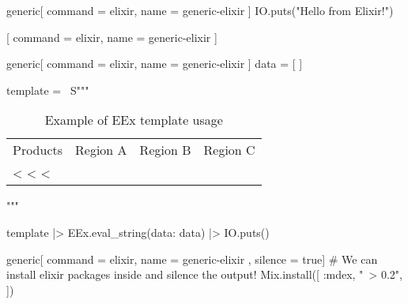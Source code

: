 \documentclass{article}
\def\exopts{
    command = elixir,
    name    = generic-elixir
}
\begin{document}
\begin{sciffi}{generic}[\exopts]
	IO.puts("Hello from Elixir!")
\end{sciffi}

[\exopts]

\begin{sciffi}{generic}[\exopts]
	data = [
	]

	template = ~S"""
	\begin{table}[ht]
		\centering
		\caption{Example of EEx template usage}
		\begin{tabular}{lrrr}
			Products & Region A & Region B & Region C \\
			<%
                <%
			<%
		\end{tabular}
	\end{table}
	"""

	template
	|> EEx.eval_string(data: data)
	|> IO.puts()
\end{sciffi}

\begin{sciffi}{generic}[\exopts, silence = true]
	# We can install elixir packages inside and silence the output!
	Mix.install([
		{:mdex, "~> 0.2"},
	])
\end{sciffi}
\end{document}
